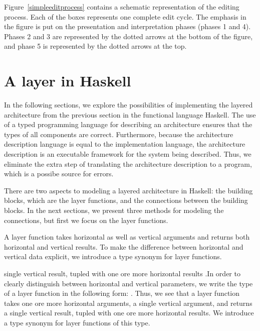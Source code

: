 \documentclass[preprint,natbib]{sigplanconf}
\begin{document}
\bc
Figure~\ref{simpleeditprocess} contains a schematic representation of the editing process. Each of the boxes represents one complete edit cycle. The emphasis in the figure is put on the presentation and interpretation phases (phases 1 and 4). Phases 2 and 3 are represented by the dotted arrows at the bottom of the figure, and phase 5 is represented by the dotted arrows at the top.
\ec



%																
%																
%																
\section{A layer in Haskell} \label{sect:layerInHaskell}

In the following sections, we explore the possibilities of implementing the layered architecture from the previous section in the functional language Haskell. The use of a typed programming language for describing an architecture ensures that the types of all components are correct. Furthermore, because the architecture description language is equal to the implementation language, the architecture description is an executable framework for the system being described. Thus, we eliminate the extra step of translating the architecture description to a program, which is a possibe source for errors.


There are two aspects to modeling a layered architecture in Haskell: the building blocks, which are the layer functions, and the connections between the building blocks. In the next sections, we present three methods for modeling the connections, but first we focus on the layer functions. 

A layer function takes  horizontal as well as vertical arguments and returns both  horizontal and vertical results. To make the difference between horizontal and vertical data explicit, we introduce a type synonym for layer functions.

\bc single vertical result, tupled with one ore more horizontal results .In order to clearly distinguish between horizontal and vertical parameters, we write the type of a layer function in the following form: . Thus, we see that a layer function takes one ore more horizontal arguments, a single vertical argument, and returns a single vertical result, tupled with one ore more horizontal results. We introduce a type synonym for layer functions of this type. \ec

\end{document}
